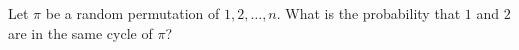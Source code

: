 Let $\pi$ be a random permutation of $1, 2, \dots , n$.
What is the probability that $1$ and $2$ are in the same cycle of $\pi$?
